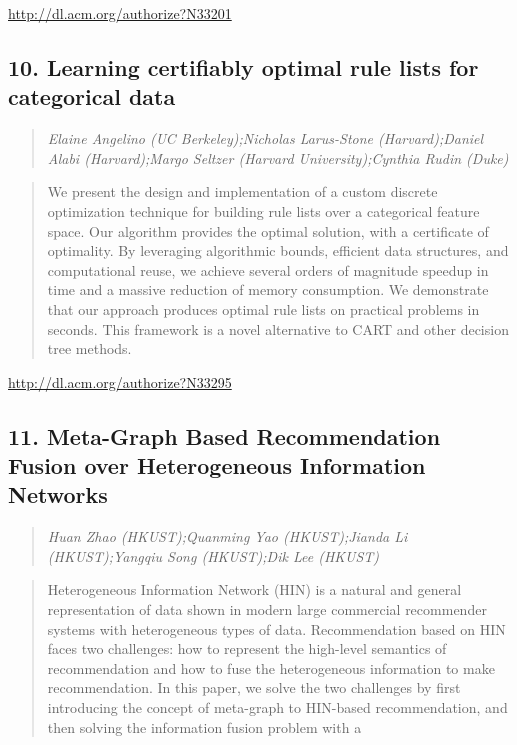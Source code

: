 \documentclass{article}
\begin{document}
\href{http://dl.acm.org/authorize?N33201}{http://dl.acm.org/authorize?N33201}

\subsection{10. Learning certifiably optimal rule lists for categorical data}

\begin{quote}
\footnotesize{\textit{Elaine Angelino (UC Berkeley);Nicholas Larus-Stone (Harvard);Daniel Alabi (Harvard);Margo Seltzer (Harvard University);Cynthia Rudin (Duke)}}

\end{quote}

\begin{quote}
We present the design and implementation of a custom discrete optimization technique for building rule lists over a categorical feature space. Our algorithm provides the optimal solution, with a certificate of optimality. By leveraging algorithmic bounds, efficient data structures, and computational reuse, we achieve several orders of magnitude speedup in time and a massive reduction of memory consumption. We demonstrate that our approach produces optimal rule lists on practical problems in seconds. This framework is a novel alternative to CART and other decision tree methods.
\end{quote}

\href{http://dl.acm.org/authorize?N33295}{http://dl.acm.org/authorize?N33295}

\subsection{11. Meta-Graph Based Recommendation Fusion over Heterogeneous Information Networks}

\begin{quote}
\footnotesize{\textit{Huan Zhao (HKUST);Quanming Yao (HKUST);Jianda Li (HKUST);Yangqiu Song (HKUST);Dik Lee (HKUST)}}

\end{quote}

\begin{quote}
Heterogeneous Information Network (HIN) is a natural and general representation of data shown in modern large commercial recommender systems with heterogeneous types of data. Recommendation based on HIN faces two challenges: how to represent the high-level semantics of recommendation and how to fuse the heterogeneous information to make recommendation. In this paper, we solve the two challenges by first introducing the concept of meta-graph to HIN-based recommendation, and then solving the information fusion problem with a
\end{quote}
\end{document}
